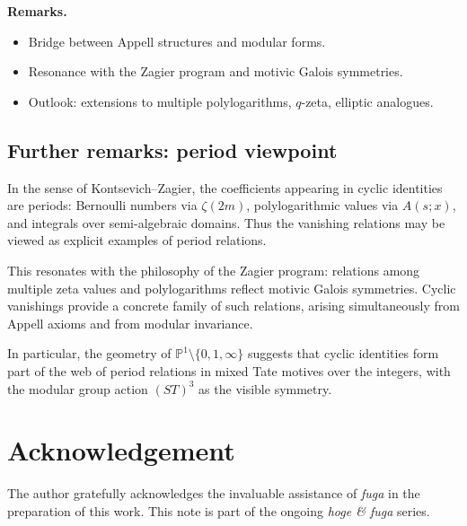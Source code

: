 \documentclass[12pt]{article}
\numberwithin{equation}{section}
\begin{document}
\noindent\textbf{Remarks.}
\begin{itemize}
\item Bridge between Appell structures and modular forms.
\item Resonance with the Zagier program\cite{Zagier1991} and motivic Galois symmetries.
\item Outlook: extensions to multiple polylogarithms, $q$-zeta, elliptic analogues.
\end{itemize}

\subsection*{Further remarks: period viewpoint}

In the sense of Kontsevich--Zagier\cite{KontsevichZagier2001}, the coefficients appearing in cyclic
identities are periods: Bernoulli numbers via $\zeta(2m)$, polylogarithmic
values via $A(s;x)$, and integrals over semi-algebraic domains. Thus the
vanishing relations may be viewed as explicit examples of period relations.

This resonates with the philosophy of the Zagier program\cite{Zagier1991}: relations among
multiple zeta values and polylogarithms reflect motivic Galois symmetries.
Cyclic vanishings provide a concrete family of such relations, arising
simultaneously from Appell axioms and from modular invariance.

In particular, the geometry of $\mathbb{P}^1\setminus\{0,1,\infty\}$ suggests
that cyclic identities form part of the web of period relations in mixed Tate
motives over the integers, with the modular group action $(ST)^3$ as the
visible symmetry.

\section*{Acknowledgement}

The author gratefully acknowledges the invaluable assistance of \emph{fuga}
in the preparation of this work. This note is part of the ongoing
\emph{hoge \& fuga} series.
\end{document}
